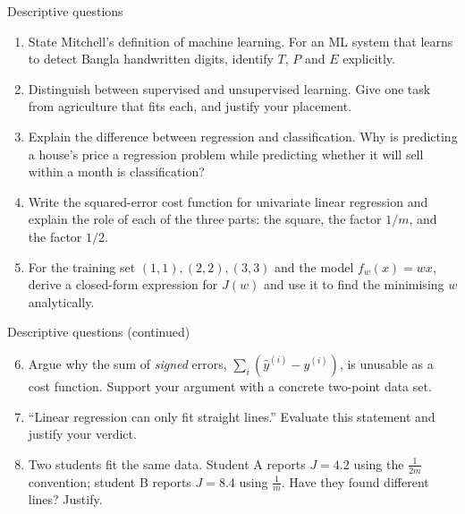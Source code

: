 \documentclass[aspectratio=169,10pt]{beamer}
\begin{document}
\begin{frame}{Descriptive questions}
  \small
  \begin{enumerate}
    \item State Mitchell's definition of machine learning. For an ML system that
          learns to detect Bangla handwritten digits, identify $T$, $P$ and $E$
          explicitly.  
    \item Distinguish between supervised and unsupervised learning. Give one task
          from agriculture that fits each, and justify your placement. 
    \item Explain the difference between regression and classification. Why is
          predicting a house's price a regression problem while predicting whether
          it will sell within a month is classification? 
    \item Write the squared-error cost function for univariate linear regression
          and explain the role of each of the three parts: the square, the factor
          $1/m$, and the factor $1/2$.  
    \item For the training set $(1,1),(2,2),(3,3)$ and the model $f_w(x)=wx$,
          derive a closed-form expression for $J(w)$ and use it to find the
          minimising $w$ analytically.  
  \end{enumerate}
\end{frame}

\begin{frame}{Descriptive questions (continued)}
  \small
  \begin{enumerate}\setcounter{enumi}{5}
    \item Argue why the sum of \emph{signed} errors,
          $\sum_i(\hat y^{(i)}-y^{(i)})$, is unusable as a cost function.
          Support your argument with a concrete two-point data set.  
    \item ``Linear regression can only fit straight lines.'' Evaluate this
          statement and justify your verdict.  
    \item Two students fit the same data. Student A reports $J=4.2$ using the
          $\tfrac{1}{2m}$ convention; student B reports $J=8.4$ using $\tfrac1m$.
          Have they found different lines? Justify.  
  \end{enumerate}
\end{frame}
\end{document}

